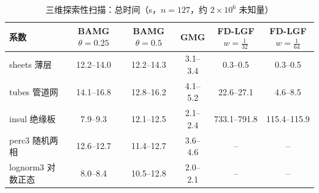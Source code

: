 \begin{table}[H]\centering\small
\caption{三维探索性扫描：总时间（s，$n=127$，约 $2\times10^6$ 未知量）}\label{tab:s3time}
\begin{tabular}{lccccc}
\toprule
系数 & BAMG $\theta{=}0.25$ & BAMG $\theta{=}0.5$ & GMG & FD-LGF $w{=}\frac1{32}$ & FD-LGF $w{=}\frac1{64}$ \\
\midrule
sheets 薄层 & 12.2--14.0 & 12.2--14.3 & 3.1--3.4 & 0.3--0.5 & 0.3--0.5 \\
tubes 管道网 & 14.1--16.8 & 12.8--16.2 & 4.1--5.2 & 22.6--27.1 & 4.6--8.5 \\
insul 绝缘板 & 7.9--9.3 & 12.1--12.5 & 2.1--2.4 & 733.1--791.8 & 115.4--115.9 \\
perc3 随机两相 & 12.6--12.7 & 11.4--12.7 & 3.6--4.6 & -- & -- \\
lognorm3 对数正态 & 8.0--8.4 & 10.5--12.8 & 2.0--2.1 & -- & -- \\
\bottomrule
\end{tabular}
\end{table}